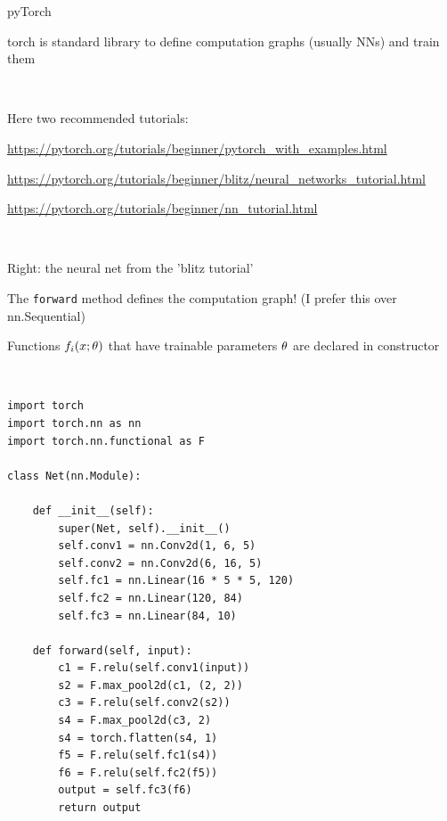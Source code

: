 \begin{frame}[fragile]
\begin{slidecore}{pyTorch}

\item torch is standard library to define computation graphs (usually NNs) and train them

~

\begin{minipage}[c]{.5\columnwidth}

\item Here two recommended tutorials:

\begin{items} \ttiny
\item \url{https://pytorch.org/tutorials/beginner/pytorch_with_examples.html}

\item \url{https://pytorch.org/tutorials/beginner/blitz/neural_networks_tutorial.html}

\item \url{https://pytorch.org/tutorials/beginner/nn_tutorial.html}
\end{items}

~

\item Right: the neural net from the 'blitz tutorial'
\begin{items}
\item The \texttt{forward} method defines the computation graph! (I prefer this over nn.Sequential)
\item Functions $f_i(x;\theta)$ that have trainable parameters $\theta$ are declared in constructor
\end{items}

\end{minipage}~~~\begin{minipage}[c]{.4\columnwidth}

\fontsize{7}{5}\selectfont

\begin{verbatim}
import torch
import torch.nn as nn
import torch.nn.functional as F

class Net(nn.Module):

    def __init__(self):
        super(Net, self).__init__()
        self.conv1 = nn.Conv2d(1, 6, 5)
        self.conv2 = nn.Conv2d(6, 16, 5)
        self.fc1 = nn.Linear(16 * 5 * 5, 120)
        self.fc2 = nn.Linear(120, 84)
        self.fc3 = nn.Linear(84, 10)

    def forward(self, input):
        c1 = F.relu(self.conv1(input))
        s2 = F.max_pool2d(c1, (2, 2))
        c3 = F.relu(self.conv2(s2))
        s4 = F.max_pool2d(c3, 2)
        s4 = torch.flatten(s4, 1)
        f5 = F.relu(self.fc1(s4))
        f6 = F.relu(self.fc2(f5))
        output = self.fc3(f6)
        return output
\end{verbatim}
\end{minipage}

\end{slidecore}
\end{frame}

